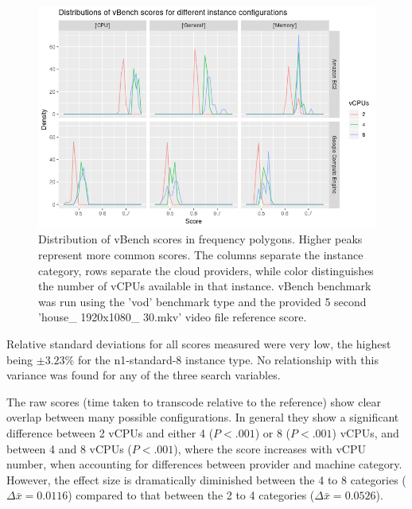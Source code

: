 \documentclass{report}
\begin{document}
\begin{figure}[!ht]
  \centering
   \includegraphics[scale=0.7]{vbench_dists}
   \caption{Distribution of vBench scores in frequency polygons. Higher peaks represent more common scores. The columns separate the instance category, rows separate the cloud providers, while color distinguishes the number of vCPUs available in that instance. vBench benchmark was run using the 'vod' benchmark type and the provided 5 second 'house\_ 1920x1080\_ 30.mkv' video file reference score.}
  \label{fig:vbench-dists}
\end{figure}


Relative standard deviations for all scores measured were very low, the highest being $\pm 3.23\%$ for the n1-standard-8 instance type. No relationship with this variance was found for any of the three search variables.

The raw scores (time taken to transcode relative to the reference) show clear overlap between many possible configurations. In general they show a significant difference between 2 vCPUs and either 4 ($P < .001$) or 8 ($P < .001$) vCPUs, and between 4 and 8 vCPUs ($P < .001$), where the score increases with vCPU number, when accounting for differences between provider and machine category. However, the effect size is dramatically diminished between the 4 to 8 categories ($\Delta \bar{x} = 0.0116$) compared to that between the 2 to 4 categories ($\Delta \bar{x} = 0.0526$).
\end{document}
